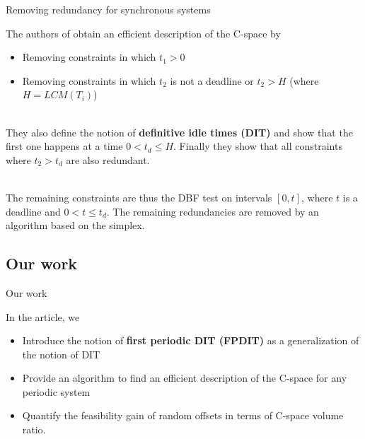 \documentclass{beamer}
\begin{document}
    \begin{frame}{Removing redundancy for synchronous systems}

    The authors of \cite{george2009characterization} obtain an efficient description of the C-space by
    \begin{itemize}
        \item Removing constraints in which $t_1 > 0$
        \item Removing constraints in which $t_2$ is not a deadline or $t_2 > H$ (where $H = LCM(T_i)$)
    \end{itemize}

    ~\\

    They also define the notion of \textbf{definitive idle times (DIT)} and show that the first one happens at a time $0 < t_d \leqslant H$. Finally they show that all constraints where $t_2 > t_d$ are also redundant.

    ~\\

    The remaining constraints are thus the DBF test on intervals $[0, t]$, where $t$ is a deadline and $0 < t \leqslant t_d$. The remaining redundancies are removed by an algorithm based on the simplex.

    \end{frame}




	\subsection{Our work}

	\begin{frame}{Our work}

	In the article, we
    \begin{itemize}
        \item Introduce the notion of \textbf{first periodic DIT (FPDIT)} as a generalization of the notion of DIT
        \item Provide an algorithm to find an efficient description of the C-space for any periodic system
        \item Quantify the feasibility gain of random offsets in terms of C-space volume ratio.
    \end{itemize}

	\end{frame}
\end{document}
